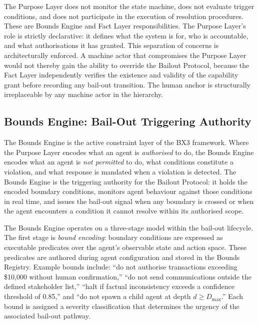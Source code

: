 The Purpose Layer does not monitor the state machine, does not evaluate trigger conditions, and does not participate in the execution of resolution procedures. These are Bounds Engine and Fact Layer responsibilities. The Purpose Layer's role is strictly declarative: it defines what the system is for, who is accountable, and what authorisations it has granted. This separation of concerns is architecturally enforced. A machine actor that compromises the Purpose Layer would not thereby gain the ability to override the Bailout Protocol, because the Fact Layer independently verifies the existence and validity of the capability grant before recording any bail-out transition. The human anchor is structurally irreplaceable by any machine actor in the hierarchy.

\subsection{Bounds Engine: Bail-Out Triggering Authority}
\label{sec:bounds-engine-triggering}

The Bounds Engine is the active constraint layer of the BX3 framework. Where the Purpose Layer encodes what an agent is \emph{authorised} to do, the Bounds Engine encodes what an agent is \emph{not permitted} to do, what conditions constitute a violation, and what response is mandated when a violation is detected. The Bounds Engine is the triggering authority for the Bailout Protocol: it holds the encoded boundary conditions, monitors agent behaviour against those conditions in real time, and issues the bail-out signal when any boundary is crossed or when the agent encounters a condition it cannot resolve within its authorised scope.

The Bounds Engine operates on a three-stage model within the bail-out lifecycle. The first stage is \emph{bound encoding}: boundary conditions are expressed as executable predicates over the agent's observable state and action space. These predicates are authored during agent configuration and stored in the Bounds Registry. Example bounds include: ``do not authorise transactions exceeding \$10,000 without human confirmation,'' ``do not send communications outside the defined stakeholder list,'' ``halt if factual inconsistency exceeds a confidence threshold of 0.85,'' and ``do not spawn a child agent at depth $d \geq D_{\max}$.'' Each bound is assigned a severity classification that determines the urgency of the associated bail-out pathway.

